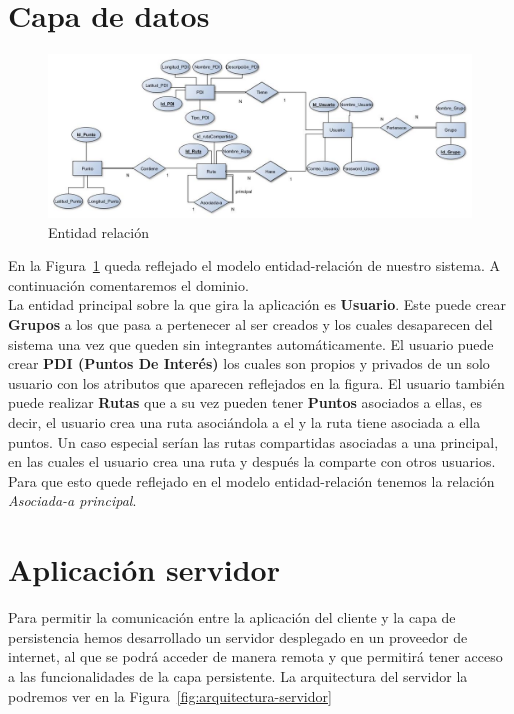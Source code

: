 \section{Capa de datos}
\begin{figure}[H]
		\centering
		\includegraphics[width=\textwidth] {BD.jpg}
		\caption{Entidad relación  }\label{fig:BD}
	\end{figure}
	En la Figura~\ref{fig:BD} queda reflejado el modelo  entidad-relación de nuestro sistema. A continuación comentaremos el dominio.\\
	La entidad principal sobre la que gira la aplicación es \textbf{Usuario}. Este puede crear \textbf{Grupos} a los que pasa a pertenecer al ser creados y los cuales desaparecen del sistema una vez que queden sin integrantes automáticamente.  El usuario puede crear \textbf{PDI (Puntos De Interés)} los cuales son propios y privados de un solo usuario con los atributos que aparecen reflejados en la figura. El usuario también puede realizar \textbf{Rutas} que a su vez pueden tener \textbf{Puntos} asociados a ellas, es decir, el  usuario crea una ruta asociándola a el y la ruta tiene asociada a ella puntos.
 Un caso especial serían las rutas compartidas asociadas a una principal, en las cuales el usuario crea una ruta y después la comparte con otros usuarios. Para que esto quede reflejado en el modelo entidad-relación tenemos la relación \textit{Asociada-a principal}.
	
\section{Aplicación servidor}
Para permitir la comunicación entre la aplicación del cliente y la capa de persistencia hemos desarrollado un servidor desplegado en un proveedor de internet, al que se podrá acceder de manera remota y que permitirá tener acceso a las funcionalidades de la capa persistente. La arquitectura del servidor la podremos ver en la Figura~\ref{fig:arquitectura-servidor}

